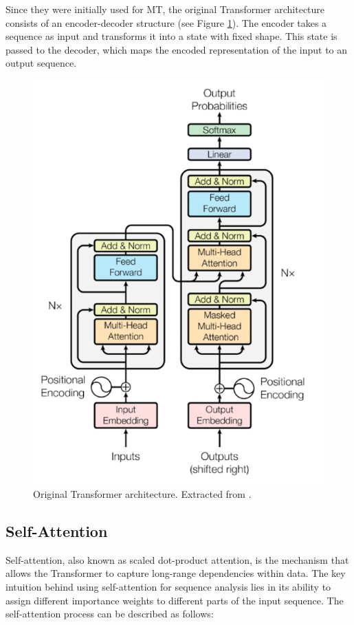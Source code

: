 \documentclass[11pt,english,listoffigures,listoftables]{tfgetsinf}
\begin{document}
Since they were initially used for MT, the original Transformer architecture consists of an encoder-decoder structure (see Figure \ref{fig:transformer}). The encoder takes a sequence as input and transforms it into a state with fixed shape. This state is passed to the decoder, which maps the encoded representation of the input to an output sequence.

\begin{figure}[h]
    \centering
    \includegraphics[width=0.5\linewidth]{figures/transformer.pdf}
    \caption{Original Transformer architecture. Extracted from \cite{vaswani2017attention}.}
    \label{fig:transformer}
\end{figure}


\subsection{Self-Attention}

Self-attention, also known as scaled dot-product attention, is the mechanism that allows the Transformer to capture long-range dependencies within data. The key intuition behind using self-attention for sequence analysis lies in its ability to assign different importance weights to different parts of the input sequence. The self-attention process can be described as follows:
\end{document}
